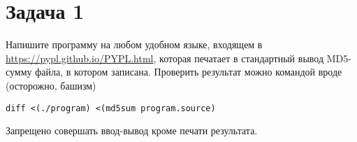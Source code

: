 \section{Задача 1}
Напишите программу на любом удобном языке,
входящем в \url{https://pypl.github.io/PYPL.html},
которая печатает в стандартный вывод MD5-сумму файла,
в котором записана.
Проверить результат можно командой вроде (осторожно, башизм)
\begin{verbatim}
diff <(./program) <(md5sum program.source)
\end{verbatim}
Запрещено совершать ввод-вывод кроме печати результата.
